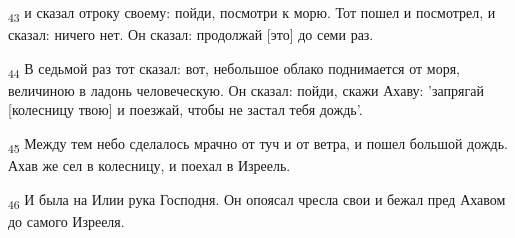 \begin{tcolorbox}
\textsubscript{43} и сказал отроку своему: пойди, посмотри к морю. Тот пошел и посмотрел, и сказал: ничего нет. Он сказал: продолжай [это] до семи раз.
\end{tcolorbox}
\begin{tcolorbox}
\textsubscript{44} В седьмой раз тот сказал: вот, небольшое облако поднимается от моря, величиною в ладонь человеческую. Он сказал: пойди, скажи Ахаву: 'запрягай [колесницу твою] и поезжай, чтобы не застал тебя дождь'.
\end{tcolorbox}
\begin{tcolorbox}
\textsubscript{45} Между тем небо сделалось мрачно от туч и от ветра, и пошел большой дождь. Ахав же сел в колесницу, и поехал в Изреель.
\end{tcolorbox}
\begin{tcolorbox}
\textsubscript{46} И была на Илии рука Господня. Он опоясал чресла свои и бежал пред Ахавом до самого Изрееля.
\end{tcolorbox}
